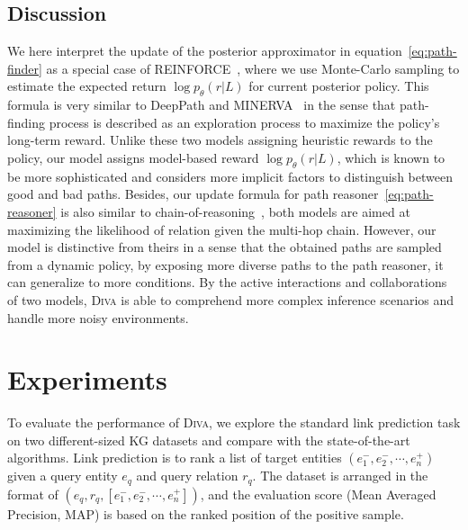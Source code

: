 \documentclass[11pt,a4paper]{article}
\begin{document}
\subsection{Discussion}
We here interpret the update of the posterior approximator in equation~\autoref{eq:path-finder} as a special case of REINFORCE~\cite{williams1992simple}, where we use Monte-Carlo sampling to estimate the expected return $\log p_{\theta}(r|L)$ for current posterior policy. This formula is very similar to DeepPath and MINERVA~\cite{xiong2017deeppath,das2017go} in the sense that path-finding process is described as an exploration process to maximize the policy's long-term reward. Unlike these two models assigning heuristic rewards to the policy, our model assigns model-based reward $\log{p_{\theta}(r|L)}$, which is known to be more sophisticated and considers more implicit factors to distinguish between good and bad paths.
Besides, our update formula for path reasoner~\autoref{eq:path-reasoner} is also similar to chain-of-reasoning~\cite{das2016chains}, both models are aimed at maximizing the likelihood of relation given the multi-hop chain. However, our model is distinctive from theirs in a sense that the obtained paths are sampled from a dynamic policy, by exposing more diverse paths to the path reasoner, it can generalize to more conditions. By the active interactions and collaborations of two models, \textsc{Diva} is able to comprehend more complex inference scenarios and handle more noisy environments.    

\section{Experiments}
\label{sec:exp}
To evaluate the performance of \textsc{Diva}, we explore the standard link prediction task on two different-sized KG datasets and compare with the state-of-the-art algorithms. Link prediction is to rank a list of target entities $(e_1^-, e_2^-, \cdots, e_n^+)$ given a query entity $e_q$ and query relation $r_q$. The dataset is arranged in the format of $(e_q, r_q, [e_1^-, e_2^-, \cdots, e_n^+])$, and the evaluation score (Mean Averaged Precision, MAP) is based on the ranked position of the positive sample.
\end{document}

